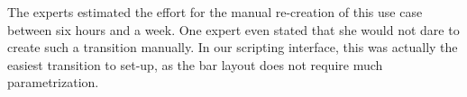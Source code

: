 








The experts estimated the effort for the manual re-creation of this use case between six hours and a week. One expert even stated that she would not dare to create such a transition manually. In our scripting interface, this was actually the easiest transition to set-up, as the bar layout does not require much parametrization. 
